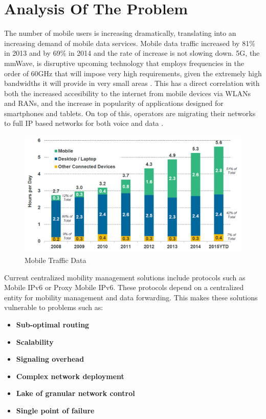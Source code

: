 \chapter{Analysis Of The Problem}\label{sec:chap:3}

The number of mobile users is increasing dramatically, translating into an increasing demand of mobile data services. Mobile data traffic increased by 81\% in 2013 and by 69\% in 2014 \cite{internet_trends} and the rate of increase is not slowing down. 5G, the mmWave, is disruptive upcoming technology that employs frequencies in the order of 60GHz that will impose very high requirements, given the extremely high bandwidths it will provide in very small areas \cite{5g}. This has a direct correlation with both the increased accesibility to the internet from mobile devices via WLANs and RANs, and the increase in popularity of applications designed for smartphones and tablets. On top of this, operators are migrating their networks to full IP based networks for both voice and data \cite{fama}.

\begin{center}
\begin{figure}[h!]
  \centering
    \includegraphics[scale=0.4]{./images/traffic_data}
	\caption{Mobile Traffic Data}
	\label{traffic_data-fig}
\end{figure}
\end{center}

Current centralized mobility management solutions include protocols such as Mobile IPv6 or Proxy Mobile IPv6. These protocols depend on a centralized entity for mobility management and data forwarding. This makes these solutions vulnerable to problems such as:

\begin{itemize}
\item{\textbf{Sub-optimal routing}}
\item{\textbf{Scalability}}
\item{\textbf{Signaling overhead}}
\item{\textbf{Complex network deployment}}
\item{\textbf{Lake of granular network control}}
\item{\textbf{Single point of failure}}
\end{itemize}


